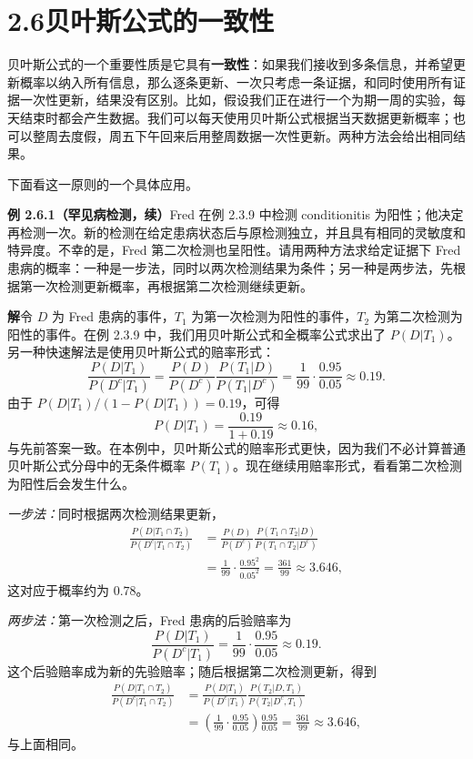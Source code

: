 \documentclass[UTF8, 12pt, fontset=fandol, oneside]{ctexart}
\begin{document}
\section*{2.6\quad 贝叶斯公式的一致性}

贝叶斯公式的一个重要性质是它具有\textbf{一致性}：如果我们接收到多条信息，并希望更新概率以纳入所有信息，那么逐条更新、一次只考虑一条证据，和同时使用所有证据一次性更新，结果没有区别。比如，假设我们正在进行一个为期一周的实验，每天结束时都会产生数据。我们可以每天使用贝叶斯公式根据当天数据更新概率；也可以整周去度假，周五下午回来后用整周数据一次性更新。两种方法会给出相同结果。

下面看这一原则的一个具体应用。

\noindent\textbf{例 2.6.1（罕见病检测，续）}\quad Fred 在例 2.3.9 中检测 conditionitis 为阳性；他决定再检测一次。新的检测在给定患病状态后与原检测独立，并且具有相同的灵敏度和特异度。不幸的是，Fred 第二次检测也呈阳性。请用两种方法求给定证据下 Fred 患病的概率：一种是一步法，同时以两次检测结果为条件；另一种是两步法，先根据第一次检测更新概率，再根据第二次检测继续更新。

\noindent\textbf{解}\quad 令 $D$ 为 Fred 患病的事件，$T_1$ 为第一次检测为阳性的事件，$T_2$ 为第二次检测为阳性的事件。在例 2.3.9 中，我们用贝叶斯公式和全概率公式求出了 $P(D|T_1)$。另一种快速解法是使用贝叶斯公式的赔率形式：
\[
  \frac{P(D|T_1)}{P(D^c|T_1)}
  =
  \frac{P(D)}{P(D^c)}\frac{P(T_1|D)}{P(T_1|D^c)}
  =
  \frac{1}{99}\cdot\frac{0.95}{0.05}
  \approx 0.19.
\]
由于 $P(D|T_1)/(1-P(D|T_1))=0.19$，可得
\[
  P(D|T_1)=\frac{0.19}{1+0.19}\approx 0.16,
\]
与先前答案一致。在本例中，贝叶斯公式的赔率形式更快，因为我们不必计算普通贝叶斯公式分母中的无条件概率 $P(T_1)$。现在继续用赔率形式，看看第二次检测为阳性后会发生什么。

\noindent\textit{一步法：}同时根据两次检测结果更新，
\[
\begin{aligned}
  \frac{P(D|T_1\cap T_2)}{P(D^c|T_1\cap T_2)}
  &=
  \frac{P(D)}{P(D^c)}
  \frac{P(T_1\cap T_2|D)}{P(T_1\cap T_2|D^c)}\\
  &=
  \frac{1}{99}\cdot\frac{0.95^2}{0.05^2}
  =
  \frac{361}{99}
  \approx 3.646,
\end{aligned}
\]
这对应于概率约为 $0.78$。

\noindent\textit{两步法：}第一次检测之后，Fred 患病的后验赔率为
\[
  \frac{P(D|T_1)}{P(D^c|T_1)}
  =
  \frac{1}{99}\cdot\frac{0.95}{0.05}
  \approx 0.19.
\]
这个后验赔率成为新的先验赔率；随后根据第二次检测更新，得到
\[
\begin{aligned}
  \frac{P(D|T_1\cap T_2)}{P(D^c|T_1\cap T_2)}
  &=
  \frac{P(D|T_1)}{P(D^c|T_1)}
  \frac{P(T_2|D,T_1)}{P(T_2|D^c,T_1)}\\
  &=
  \left(\frac{1}{99}\cdot\frac{0.95}{0.05}\right)
  \frac{0.95}{0.05}
  =
  \frac{361}{99}
  \approx 3.646,
\end{aligned}
\]
与上面相同。
\end{document}
